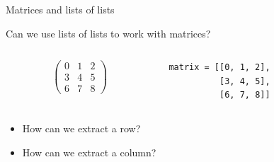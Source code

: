 \documentclass[svgnames]{beamer}
\newcommand\smiley{\textcolor{positive}{\DejaSans ☺}}
\newcommand\frownie{\textcolor{negative}{\DejaSans ☹}}
\begin{document}
\begin{frame}[fragile, t]{Matrices and lists of lists}
 
 \vspace{0.3truecm}
 Can we use lists of lists to work with matrices?

 \begin{columns}
  \begin{column}{0.4\textwidth}
   \begin{displaymath}
    \begin{pmatrix}
     0 & 1 & 2\\
     3 & 4 & 5\\
     6 & 7 & 8
    \end{pmatrix}
   \end{displaymath}
  \end{column}%
  \begin{column}{0.6\textwidth}
   \begin{center}
    \begin{lstlisting}
matrix = [[0, 1, 2],
          [3, 4, 5],
          [6, 7, 8]]
    \end{lstlisting}

    \vspace{\baselineskip}
   \end{center}
  \end{column}
 \end{columns}
 \begin{itemize}
  \item How can we extract a row? \uncover<3>{\smiley}
  \item How can we extract a column? \uncover<3>{\frownie}
 \end{itemize}

 \vspace{0.3truecm}
 \begin{center}
 \end{center}
\end{frame}
\end{document}
